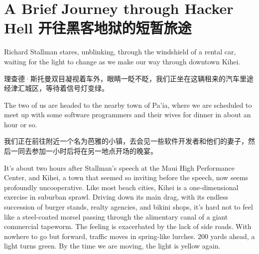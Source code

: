 

\chapter{\ifdefined\eng
A Brief Journey through Hacker Hell
\fi
\ifdefined\chs
开往黑客地狱的短暂旅途
\fi
}




\ifdefined\eng
Richard Stallman stares, unblinking, through the windshield of a rental car, waiting for the light to change as we make our way through downtown Kihei.
\fi

\ifdefined\chs
理查德·斯托曼双目凝视着车外，眼睛一眨不眨，我们正坐在这辆租来的汽车里途经津汇城区，等待着信号灯变绿。
\fi

\ifdefined\eng
The two of us are headed to the nearby town of Pa'ia, where we are scheduled to meet up with some software programmers and their wives for dinner in about an hour or so.
\fi

\ifdefined\chs
我们正在前往附近一个名为芭雅的小镇，去会见一些软件开发者和他们的妻子，然后一同去参加一小时后将在另一地点开场的晚宴。
\fi

\ifdefined\eng
It's about two hours after Stallman's speech at the Maui High Performance Center, and Kihei, a town that seemed so inviting before the speech, now seems profoundly uncooperative. Like most beach cities, Kihei is a one-dimensional exercise in suburban sprawl. Driving down its main drag, with its endless succession of burger stands, realty agencies, and bikini shops, it's hard not to feel like a steel-coated morsel passing through the alimentary canal of a giant commercial tapeworm. The feeling is exacerbated by the lack of side roads. With nowhere to go but forward, traffic moves in spring-like lurches. 200 yards ahead, a light turns green. By the time we are moving, the light is yellow again.
\fi


